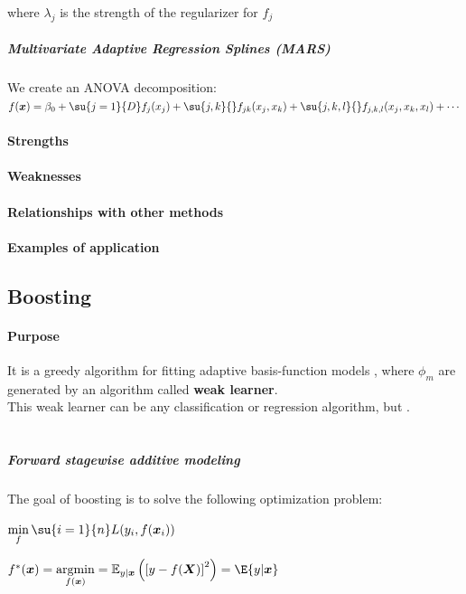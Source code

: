  where $\lambda_{j}$ is the strength of the regularizer for $f_{j}$
\subparagraph{Multivariate Adaptive Regression Splines (MARS)}
We create an ANOVA decomposition:
$f(\bm{x}) = \beta_{0} + \su{j=1}{D}f_{j}(x_{j}) + \su{j,k}{}f_{jk}(x_{j},x_{k}) + 
\su{j,k,l}{}f_{j,k,l}(x_{j}, x_{k}, x_{l}) + \cdots$
\paragraph{Strengths}
\paragraph{Weaknesses}
\paragraph{Relationships with other methods}
\paragraph{Examples of application}

\subsection{Boosting}
\paragraph{Purpose}
It is a greedy algorithm for fitting adaptive basis-function models , where $\phi_{m}$ are generated by an
algorithm called \textbf{weak learner}. \\
This weak learner can be any classification or regression algorithm, but .\\
\\
\subparagraph{Forward stagewise additive modeling}
The goal of boosting is to solve the following optimization problem:
\begin{center}
    $\displaystyle\min_{f}\su{i=1}{n}L(y_{i},f(\bm{x}_{i}))$
\end{center}
$f^{*}(\bm{x}) = \displaystyle\argmin_{f(\bm{x})}=\mathbb{E}_{y|\bm{x}}\left(\left[y-f(\bm{X})
    \right]^{2}\right) = \E{y|\bm{x}}$


